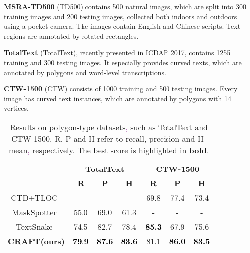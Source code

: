 \documentclass[10pt,twocolumn,letterpaper]{article}
\newcommand\jh[1]{\textcolor{purple}{#1}}
\begin{document}
\noindent\textbf{MSRA-TD500} (TD500) contains 500 natural images, which are split into 300 training images and 200 testing images, collected both indoors and outdoors using a pocket camera. The images contain English and Chinese scripts. Text regions are annotated by rotated rectangles.

\noindent\textbf{TotalText} (TotalText), recently presented in ICDAR 2017, contains 1255 training and 300 testing images. It especially provides curved texts, which are annotated by polygons and word-level transcriptions.

\noindent\textbf{CTW-1500} (CTW) consists of 1000 training and 500 testing images. Every image has curved text instances, which are annotated by polygons with 14 vertices.




\begin{table}[t!]
  \centering
\tabcolsep=0.12cm
  \fontsize{10}{10}\selectfont
  \renewcommand*{\arraystretch}{1.1}
  \begin{tabular}{c||c|c|c||c|c|c}
    \hline  
    \rule{0pt}{10pt} \multirow{2}{*}{\textbf{Method}} & \multicolumn{3}{c||}{\textbf{TotalText}} & \multicolumn{3}{c}{\textbf{CTW-1500}}\\
    \cline{2-7}
    \rule{0pt}{10pt} & \textbf{R} & \textbf{P} & \textbf{H} & \textbf{R} & \textbf{P} & \textbf{H}\\
    \hline
    \hline
    CTD+TLOC~\cite{yuliang2017detecting} & - & - & - & 69.8	& 77.4 & 73.4 \\
    MaskSpotter~\cite{lyu2018mask} & 55.0 & 69.0 & 61.3 & - & - & - \\
    TextSnake~\cite{long2018textsnake} &	74.5 & 82.7 & 78.4 & \textcolor{black}{\textbf{85.3}} & 67.9 & 75.6 \\
\hline
    \hline
    \rule{0pt}{10pt} \textbf{CRAFT(ours)} & \textcolor{black}{\textbf{79.9}} & \textcolor{black}{\textbf{87.6}} & \textcolor{black}{\textbf{83.6}} & 81.1 & \textcolor{black}{\textbf{86.0}} & \textcolor{black}{\textbf{83.5}}\\
    \hline
  \end{tabular}
  \vspace{3mm}
  \caption{Results on polygon-type datasets\jh{,} such as TotalText and CTW-1500. R, P and H refer to recall, precision and H-mean\jh{,} respectively. The best score is highlighted in {\textbf{bold}}.}
  \vspace{-3mm}
  \label{tab:result_poly}
\end{table}
\end{document}
